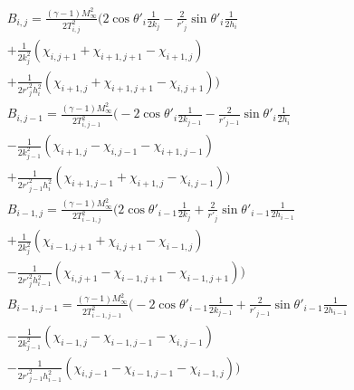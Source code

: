 \documentclass[a4paper]{article}
\begin{document}
	\begin{equation}
		\begin{split}
		B_{i,j} = \frac{(\gamma-1)M_\infty^2}{2T_{i,j}^2}
		\Biggl(
			2\cos \theta '_i \frac{1}{2k_j}
			- \frac{2}{r'_j} \sin\theta '_i \frac{1}{2h_i} \\
			+ \frac{1}{2k_j^2}( \chi_{i,j+1} + \chi_{i+1,j+1} - \chi_{i+1,j} ) \\
			+ \frac{1}{2r'^2_jh_i^2}( \chi_{i+1,j} + \chi_{i+1,j+1} - \chi_{i,j+1} )
		\Biggr) \\
		B_{i,j-1} = \frac{(\gamma-1)M_\infty^2}{2T_{i,j-1}^2}
		\Biggl(
			- 2\cos \theta '_i \frac{1}{2k_{j-1}}
			- \frac{2}{r'_{j-1}} \sin\theta '_i \frac{1}{2h_i} \\
			- \frac{1}{2k_{j-1}^2}( \chi_{i+1,j} - \chi_{i,j-1} - \chi_{i+1,j-1} ) \\
			+ \frac{1}{2r'^2_{j-1}h_i^2}( \chi_{i+1,j-1} + \chi_{i+1,j} - \chi_{i,j-1} )
		\Biggr) \\
		B_{i-1,j} = \frac{(\gamma-1)M_\infty^2}{2T_{i-1,j}^2}
		\Biggl(
			2\cos \theta '_{i-1} \frac{1}{2k_j}
			+ \frac{2}{r'_j} \sin\theta '_{i-1} \frac{1}{2h_{i-1}} \\
			+ \frac{1}{2k_j^2}( \chi_{i-1,j+1} + \chi_{i,j+1} - \chi_{i-1,j} ) \\
			- \frac{1}{2r'^2_jh_{i-1}^2}( \chi_{i,j+1} - \chi_{i-1,j+1} - \chi_{i-1,j+1} )
		\Biggr) \\
		B_{i-1,j-1} = \frac{(\gamma-1)M_\infty^2}{2T_{i-1,j-1}^2}
		\Biggl(
			- 2\cos \theta '_{i-1} \frac{1}{2k_{j-1}}
			+ \frac{2}{r'_{j-1}} \sin\theta '_{i-1} \frac{1}{2h_{i-1}} \\
			- \frac{1}{2k_{j-1}^2}( \chi_{i-1,j} - \chi_{i-1,j-1} - \chi_{i,j-1} ) \\
			- \frac{1}{2r'^2_{j-1}h_{i-1}^2}( \chi_{i,j-1} - \chi_{i-1,j-1} - \chi_{i-1,j} )
		\Biggr) \\
		\end{split}
	\end{equation}
	
\end{document}
